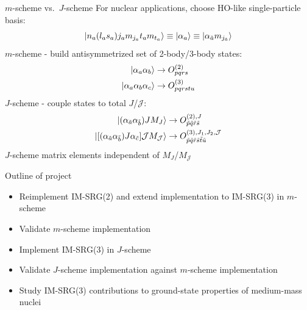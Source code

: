 \documentclass{beamer}
\begin{document}
  \begin{frame}{$m$-scheme vs.\ $J$-scheme}
    For nuclear applications, choose HO-like single-particle basis:
    \begin{equation*}
      \ket{n_a (l_a s_a) j_a m_{j_a} t_a m_{t_a}} \equiv \ket{\alpha_a} \equiv \ket{\alpha_{\tilde{a}} m_{j_{\tilde{a}}}}
    \end{equation*}
    $m$-scheme - build antisymmetrized set of 2-body/3-body states:
    \begin{align*}
      \ket{\alpha_a \alpha_b} &\rightarrow {O}^{(2)}_{pqrs} \\
      \ket{\alpha_a \alpha_b \alpha_c} &\rightarrow {O}^{(3)}_{pqrstu}
    \end{align*}
    $J$-scheme - couple states to total $J$/$\mathcal{J}$:
    \begin{align*}
      \ket{(\alpha_{\tilde{a}} \alpha_{\tilde{b}})J M_{J}} &\rightarrow O_{\tilde{p}\tilde{q}\tilde{r}\tilde{s}}^{(2),J} \\
      \ket{[(\alpha_{\tilde{a}} \alpha_{\tilde{b}}) J \alpha_{\tilde{c}}] \mathcal{J} M_{\mathcal{J}}} &\rightarrow O_{\tilde{p}\tilde{q}\tilde{r}\tilde{s}\tilde{t}\tilde{u}}^{(3),J_1,J_2,\mathcal{J}}
    \end{align*}
    $J$-scheme matrix elements independent of $M_J$/$M_{\mathcal{J}}$
  \end{frame}


  \begin{frame}{Outline of project}
    \begin{itemize}
      \item{Reimplement IM-SRG(2) and extend implementation to IM-SRG(3) in $m$-scheme}
      \item{Validate $m$-scheme implementation}
      \item{Implement IM-SRG(3) in $J$-scheme}
      \item{Validate $J$-scheme implementation against $m$-scheme implementation}
      \item{Study IM-SRG(3) contributions to ground-state properties of medium-mass nuclei}
    \end{itemize}
  \end{frame}
\end{document}
